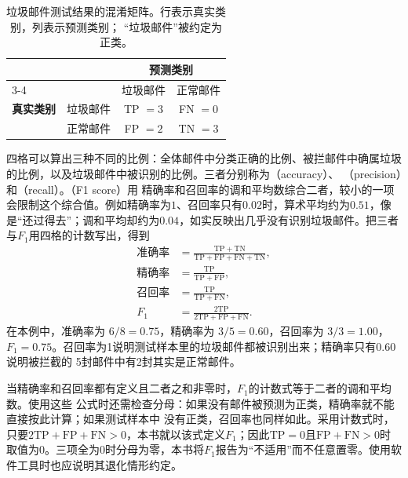 \begin{table}[htbp]
  \centering
  \small
  \begin{tabular}{@{}llcc@{}}
    \toprule
    & & \multicolumn{2}{c}{\textbf{预测类别}} \\
    \cmidrule(l){3-4}
    & & 垃圾邮件 & 正常邮件 \\
    \midrule
    \textbf{真实类别} & 垃圾邮件 & TP $=3$ & FN $=0$ \\
                    & 正常邮件 & FP $=2$ & TN $=3$ \\
    \bottomrule
  \end{tabular}
  \caption{垃圾邮件测试结果的混淆矩阵。行表示真实类别，列表示预测类别；
  “垃圾邮件”被约定为正类。}
  \label{tab:spam-confusion-matrix}
\end{table}

四格可以算出三种不同的比例：全体邮件中分类正确的比例、被拦邮件中确属垃圾的比例，以及垃圾邮件中被识别的比例。三者分别称为（accuracy）、
（precision）和（recall）。（F1 score）用
精确率和召回率的调和平均数综合二者，较小的一项会限制这个综合值。例如精确率为$1$、召回率只有$0.02$时，算术平均约为$0.51$，像是“还过得去”；调和平均却约为$0.04$，如实反映出几乎没有识别垃圾邮件。把三者与$F_1$用四格的计数写出，得到
\begin{align}
  \text{准确率}
    &=\frac{\mathrm{TP}+\mathrm{TN}}
      {\mathrm{TP}+\mathrm{FP}+\mathrm{FN}+\mathrm{TN}},\\
  \text{精确率}
    &=\frac{\mathrm{TP}}{\mathrm{TP}+\mathrm{FP}},\\
  \text{召回率}
    &=\frac{\mathrm{TP}}{\mathrm{TP}+\mathrm{FN}},\\
  F_1
    &=\frac{2\mathrm{TP}}{2\mathrm{TP}+\mathrm{FP}+\mathrm{FN}}.
  \label{eq:classification-measures}
\end{align}
在本例中，准确率为 $6/8=0.75$，精确率为 $3/5=0.60$，召回率为 $3/3=1.00$，
$F_1=0.75$。召回率为1说明测试样本里的垃圾邮件都被识别出来；精确率只有0.60说明被拦截的
5封邮件中有2封其实是正常邮件。

当精确率和召回率都有定义且二者之和非零时，$F_1$的计数式等于二者的调和平均数。使用这些
公式时还需检查分母：如果没有邮件被预测为正类，精确率就不能直接按此计算；如果测试样本中
没有正类，召回率也同样如此。采用计数式时，只要$2\mathrm{TP}+\mathrm{FP}+\mathrm{FN}>0$，本书就以该式定义$F_1$；因此$\mathrm{TP}=0$且$\mathrm{FP}+\mathrm{FN}>0$时取值为0。三项全为0时分母为零，本书将$F_1$报告为“不适用”而不任意置零。使用软件工具时也应说明其退化情形约定。

